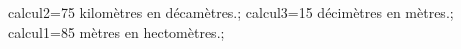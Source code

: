 \documentclass[exercice]{thedocument}%
\begin{document}
%
    \>calcul2=75 kilomètres en décamètres.;%
    \>calcul3=15 décimètres en mètres.;%
    \>calcul1=85 mètres en hectomètres.;%
\end{document}
